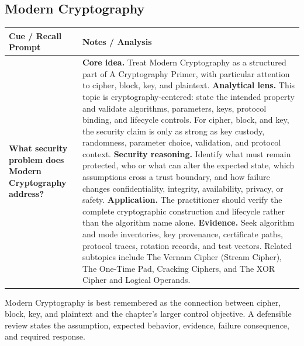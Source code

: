\documentclass[11pt]{article}
\newcommand{\CornellHeader}{%
\rowcolor{Navy}\color{white}\bfseries Cue / Recall Prompt & \color{white}\bfseries Notes / Analysis\\\hline}
\newcommand{\CornellRow}[2]{%
\cellcolor{CueGray}\RaggedRight\textbf{#1} & \RaggedRight #2\\\hline}
\begin{document}
\subsection*{Modern Cryptography}
\begin{longtable}{>{\RaggedRight\arraybackslash}p{}|>{\RaggedRight\arraybackslash}p{}}
\CornellHeader
\CornellRow{What security problem does Modern Cryptography address?}{\textbf{Core idea.} Treat Modern Cryptography as a structured part of A Cryptography Primer, with particular attention to cipher, block, key, and plaintext. \textbf{Analytical lens.} This topic is cryptography-centered: state the intended property and validate algorithms, parameters, keys, protocol binding, and lifecycle controls. For cipher, block, and key, the security claim is only as strong as key custody, randomness, parameter choice, validation, and protocol context. \textbf{Security reasoning.} Identify what must remain protected, who or what can alter the expected state, which assumptions cross a trust boundary, and how failure changes confidentiality, integrity, availability, privacy, or safety. \textbf{Application.} The practitioner should verify the complete cryptographic construction and lifecycle rather than the algorithm name alone. \textbf{Evidence.} Seek algorithm and mode inventories, key provenance, certificate paths, protocol traces, rotation records, and test vectors. Related subtopics include The Vernam Cipher (Stream Cipher), The One-Time Pad, Cracking Ciphers, and The XOR Cipher and Logical Operands.}
\end{longtable}
\begin{topicsummary}
Modern Cryptography is best remembered as the connection between cipher, block, key, and plaintext and the chapter's larger control objective. A defensible review states the assumption, expected behavior, evidence, failure consequence, and required response.
\end{topicsummary}
\end{document}
